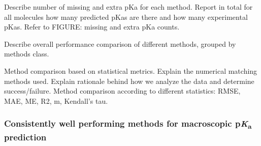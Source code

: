 \documentclass[9pt,lineno,final]{elife}
\newcommand{\pKa}{p\textit{K}\textsubscript{a}}
\begin{document}
Describe number of missing and extra pKa for each method.  
Report in total for all molecules how many predicted pKas are there and how many experimental pKas.  
Refer to FIGURE: missing and extra pKa counts.  

Describe overall performance comparison of different methods, grouped by methods class.

Method comparison based on statistical metrics.  
Explain the numerical matching methods used. Explain rationale behind how we analyze the data and determine success/failure.  
Method comparison according to different statistics: RMSE, MAE, ME, R2, m, Kendall's tau.  


\subsubsection{Consistently well performing methods for macroscopic \pKa{} prediction}
\end{document}
